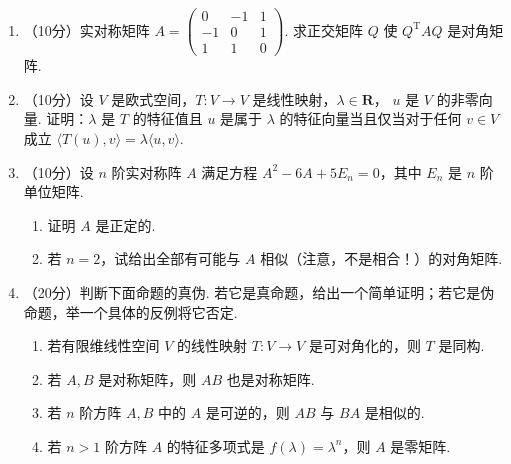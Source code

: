 \begin{enumerate}
\begin{enumerate}
        \item 证明 $(b,\lambda-a)^\mathrm{T}$ 是属于 $\lambda$ 的特征向量.

        \item 若 $A$ 有两个不同的特征值 $\lambda_1$ 和 $\lambda_2$，求可逆矩阵 $P$ 使 $P^{-1}AP$ 是对角矩阵.
    \end{enumerate}

    \item （10分）实对称矩阵 $A=\begin{pmatrix}0 & -1 & 1 \\ -1 & 0 & 1 \\ 1 & 1 & 0\end{pmatrix}$.  求正交矩阵 $Q$ 使 $Q^\mathrm{T}AQ$ 是对角矩阵.

    \item （10分）设 $V$ 是欧式空间，$T\colon V\to V$ 是线性映射，$\lambda \in \mathbf{R}$， $u$ 是 $V$ 的非零向量. 证明：$\lambda$ 是 $T$ 的特征值且 $u$ 是属于 $\lambda$ 的特征向量当且仅当对于任何 $v\in V$ 成立 $\langle T(u),v\rangle = \lambda\langle u,v\rangle$.

    \item （10分）设 $n$ 阶实对称阵 $A$ 满足方程 $A^2-6A+5E_n=0$，其中 $E_n$ 是 $n$ 阶单位矩阵.
    \begin{enumerate}
        \item 证明 $A$ 是正定的.

        \item 若 $n=2$，试给出全部有可能与 $A$ 相似（注意，不是相合！）的对角矩阵.
    \end{enumerate}

    \item （20分）判断下面命题的真伪. 若它是真命题，给出一个简单证明；若它是伪命题，举一个具体的反例将它否定.
    \begin{enumerate}
        \item 若有限维线性空间 $V$ 的线性映射 $T\colon V \to V$ 是可对角化的，则 $T$ 是同构.

        \item 若 $A,B$ 是对称矩阵，则 $AB$ 也是对称矩阵.

        \item 若 $n$ 阶方阵 $A,B$ 中的 $A$ 是可逆的，则 $AB$ 与 $BA$ 是相似的.

        \item 若 $n>1$ 阶方阵 $A$ 的特征多项式是 $f(\lambda)=\lambda^n$，则 $A$ 是零矩阵.
    \end{enumerate}
\end{enumerate}

\clearpage
